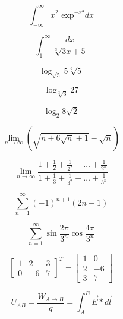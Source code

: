 \documentclass[11pt, a4paper]{article}
\begin{document}
$$
\int_{-\infty}^{\infty} x^2 \textrm{ exp}^{-x^3}dx
$$

$$
\int_{1}^{\infty} \frac{dx}{\sqrt[3]{3x + 5}}
$$

$$
\log_{\sqrt{5}} 5 \sqrt[3]{5}
$$

$$
\log_{\sqrt[3]{3}} 27
$$

$$
\log_{2} 8\sqrt{2}
$$

$$
\lim_{n \to \infty} \left(\sqrt{n + 6\sqrt{n} + 1} - \sqrt{n}\right)
$$

$$
\lim_{n \to \infty} \frac{1 + \frac{1}{2} + \frac{1}{2^2} + \ldots + \frac{1}{2^n}}{1 + \frac{1}{3} + \frac{1}{3^2} + \ldots + \frac{1}{3^n}}
$$

$$
\sum_{n=1}^{\infty} (-1)^{n+1} (2n - 1)
$$

$$
\sum_{n=1}^{\infty} \sin{\frac{2\pi}{3^n}} \cos{\frac{4\pi}{3^n}}
$$

$$
\left[\begin{array}{ccc}
    1 & 2 & 3  \\
    0 & -6 & 7 
\end{array}
\right]^T
=
\left[\begin{array}{cc}
    1 & 0 \\
    2 & -6 \\
    3 & 7
\end{array}
\right]
$$

$$
U_{AB} = \frac{W_{A \to B}}{q} = \int_{A}^{B} \vec{E} * \vec{dl}
$$
\end{document}
